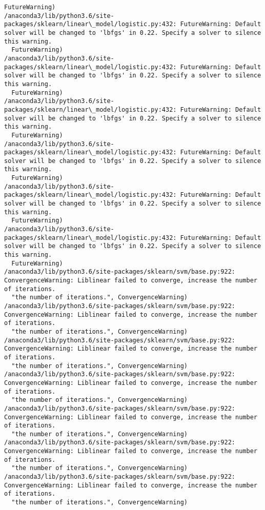 \documentclass[11pt]{article}
\begin{document}
\begin{Verbatim}[commandchars=\\\{\}]
  FutureWarning)
/anaconda3/lib/python3.6/site-packages/sklearn/linear\_model/logistic.py:432: FutureWarning: Default solver will be changed to 'lbfgs' in 0.22. Specify a solver to silence this warning.
  FutureWarning)
/anaconda3/lib/python3.6/site-packages/sklearn/linear\_model/logistic.py:432: FutureWarning: Default solver will be changed to 'lbfgs' in 0.22. Specify a solver to silence this warning.
  FutureWarning)
/anaconda3/lib/python3.6/site-packages/sklearn/linear\_model/logistic.py:432: FutureWarning: Default solver will be changed to 'lbfgs' in 0.22. Specify a solver to silence this warning.
  FutureWarning)
/anaconda3/lib/python3.6/site-packages/sklearn/linear\_model/logistic.py:432: FutureWarning: Default solver will be changed to 'lbfgs' in 0.22. Specify a solver to silence this warning.
  FutureWarning)
/anaconda3/lib/python3.6/site-packages/sklearn/linear\_model/logistic.py:432: FutureWarning: Default solver will be changed to 'lbfgs' in 0.22. Specify a solver to silence this warning.
  FutureWarning)
/anaconda3/lib/python3.6/site-packages/sklearn/linear\_model/logistic.py:432: FutureWarning: Default solver will be changed to 'lbfgs' in 0.22. Specify a solver to silence this warning.
  FutureWarning)
/anaconda3/lib/python3.6/site-packages/sklearn/svm/base.py:922: ConvergenceWarning: Liblinear failed to converge, increase the number of iterations.
  "the number of iterations.", ConvergenceWarning)
/anaconda3/lib/python3.6/site-packages/sklearn/svm/base.py:922: ConvergenceWarning: Liblinear failed to converge, increase the number of iterations.
  "the number of iterations.", ConvergenceWarning)
/anaconda3/lib/python3.6/site-packages/sklearn/svm/base.py:922: ConvergenceWarning: Liblinear failed to converge, increase the number of iterations.
  "the number of iterations.", ConvergenceWarning)
/anaconda3/lib/python3.6/site-packages/sklearn/svm/base.py:922: ConvergenceWarning: Liblinear failed to converge, increase the number of iterations.
  "the number of iterations.", ConvergenceWarning)
/anaconda3/lib/python3.6/site-packages/sklearn/svm/base.py:922: ConvergenceWarning: Liblinear failed to converge, increase the number of iterations.
  "the number of iterations.", ConvergenceWarning)
/anaconda3/lib/python3.6/site-packages/sklearn/svm/base.py:922: ConvergenceWarning: Liblinear failed to converge, increase the number of iterations.
  "the number of iterations.", ConvergenceWarning)
/anaconda3/lib/python3.6/site-packages/sklearn/svm/base.py:922: ConvergenceWarning: Liblinear failed to converge, increase the number of iterations.
  "the number of iterations.", ConvergenceWarning)

\end{Verbatim}
\end{document}
